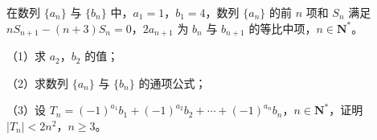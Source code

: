 \begin{question}
在数列 $\{a_n\}$ 与 $\{b_n\}$ 中，$a_1=1$，$b_1=4$，数列 $\{a_n\}$ 的前 $n$ 项和 $S_n$ 满足 $nS_{n+1}-(n+3)S_n=0$，$2a_{n+1}$ 为 $b_n$ 与 $b_{n+1}$ 的等比中项，$n\in\mathbf N^*$。

（1）求 $a_2$，$b_2$ 的值；

（2）求数列 $\{a_n\}$ 与 $\{b_n\}$ 的通项公式；

（3）设 $T_n=(-1)^{a_1}b_1+(-1)^{a_2}b_2+\cdots+(-1)^{a_n}b_n$，$n\in\mathbf N^*$，证明 $|T_n|<2n^2$，$n\geqslant3$。

\end{question}